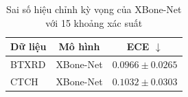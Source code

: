 \begin{table}[H]
\centering
\small
\begin{tabular}{|l|l|c|}
\hline
\multicolumn{1}{|c|}{\textbf{Dữ liệu}} & \multicolumn{1}{c|}{\textbf{Mô hình}} & \multicolumn{1}{c|}{\textbf{ECE $\downarrow$}} \\ \hline
BTXRD & \cellcolor{gray!12}XBone-Net & \cellcolor{gray!12}$0.0966\pm0.0265$ \\ \hline
CTCH & \cellcolor{gray!12}XBone-Net & \cellcolor{gray!12}$0.1032\pm0.0303$ \\ \hline
\end{tabular}
\caption{Sai số hiệu chỉnh kỳ vọng của XBone-Net với 15 khoảng xác suất}
\label{tab:classification_ece}
\end{table}

